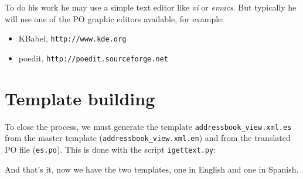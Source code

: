 To do his work he may use a simple text editor like {\em vi} or {\em emacs}.
But typically he will use one of the PO graphic editors available, for
example:

\begin{itemize}
  \item KBabel, {\tt http://www.kde.org}
  \item poedit, {\tt http://poedit.sourceforge.net}
\end{itemize}


\section{Template building}

To close the process, we must generate the template
{\tt addressbook\_view.xml.es} from the master template
({\tt addressbook\_view.xml.en}) and from the translated PO file ({\tt es.po}).
This is done with the script {\tt igettext.py}:


And that's it, now we have the two templates, one in English and one in
Spanish.


